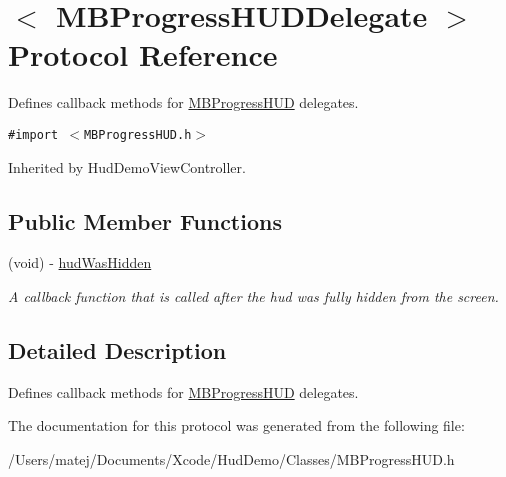 \hypertarget{protocol_m_b_progress_h_u_d_delegate-p}{
\section{$<$ MBProgressHUDDelegate $>$ Protocol Reference}
\label{protocol_m_b_progress_h_u_d_delegate-p}
}
Defines callback methods for \hyperlink{interface_m_b_progress_h_u_d}{MBProgressHUD} delegates.  


{\tt \#import $<$MBProgressHUD.h$>$}

Inherited by HudDemoViewController.

\subsection*{Public Member Functions}
\begin{CompactItemize}
\item 
\hypertarget{protocol_m_b_progress_h_u_d_delegate-p_249e40d64d6df30f2bf2f7fce209b9c7}{
(void) - \hyperlink{protocol_m_b_progress_h_u_d_delegate-p_249e40d64d6df30f2bf2f7fce209b9c7}{hudWasHidden}}
\label{protocol_m_b_progress_h_u_d_delegate-p_249e40d64d6df30f2bf2f7fce209b9c7}

\begin{CompactList}\small\item\em A callback function that is called after the hud was fully hidden from the screen. \item\end{CompactList}\end{CompactItemize}


\subsection{Detailed Description}
Defines callback methods for \hyperlink{interface_m_b_progress_h_u_d}{MBProgressHUD} delegates. 

The documentation for this protocol was generated from the following file:\begin{CompactItemize}
\item 
/Users/matej/Documents/Xcode/HudDemo/Classes/MBProgressHUD.h\end{CompactItemize}
